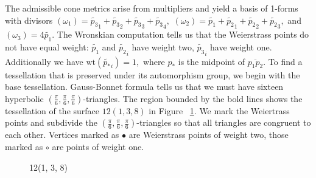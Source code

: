 \documentclass[12pt,reqno]{amsart}
\theoremstyle{definition}
\theoremstyle{remark}
\begin{document}
The admissible cone metrics arise from multipliers and yield a basis of 1-forms with divisors $(\omega_1) = \widetilde{p_3}_1 + \widetilde{p_3}_2 + \widetilde{p_3}_3 + \widetilde{p_3}_4,$ $(\omega_2) = \widetilde{p_1} + \widetilde{p_2}_1 + \widetilde{p_2}_2 + \widetilde{p_2}_3,$ and $(\omega_3) = 4 \widetilde{p_1}.$ The Wronskian computation tells us that the Weierstrass points do not have equal weight: $\widetilde{p_1}$ and $\widetilde{p_2}_i$ have weight two, $\widetilde{p_3}_i$ have weight one. Additionally we have $\textrm{wt}(\widetilde{p_*}_i) = 1,$ where $p_*$ is the midpoint of $\overline{p_1 p_2}.$ To find a tessellation that is preserved under its automorphism group, we begin with the base tessellation. Gauss-Bonnet formula tells us that we must have sixteen hyperbolic $(\frac{\pi}{6}, \frac{\pi}{6}, \frac{\pi}{6})$-triangles. The region bounded by the bold lines shows the tessellation of the surface $12(1, 3, 8)$ in Figure~ \cref{fig:138}. We mark the Weiertrass points and subdivide the $(\frac{\pi}{6}, \frac{\pi}{6}, \frac{\pi}{6})$-triangles so that all triangles are congruent to each other. Vertices marked as $\bullet$ are Weierstrass points of weight two, those marked as $\circ$ are points of weight one. 

\begin{figure}[htbp]
    \centering
    \qquad
    \caption{12(1, 3, 8)}%
    \label{fig:138}%
\end{figure}
\end{document}
